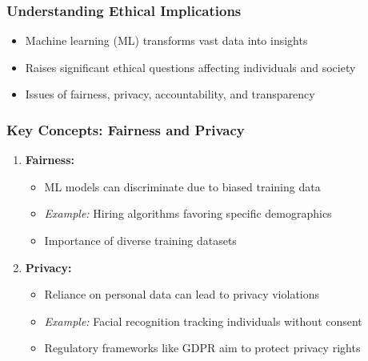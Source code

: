 \documentclass[aspectratio=169]{beamer}
\begin{document}
\begin{frame}[fragile]
    \frametitle{Understanding Ethical Implications}
    \begin{itemize}
        \item Machine learning (ML) transforms vast data into insights 
        \item Raises significant ethical questions affecting individuals and society
        \item Issues of fairness, privacy, accountability, and transparency
    \end{itemize}
\end{frame}

\begin{frame}[fragile]
    \frametitle{Key Concepts: Fairness and Privacy}
    \begin{enumerate}
        \item \textbf{Fairness:}
        \begin{itemize}
            \item ML models can discriminate due to biased training data
            \item \textit{Example:} Hiring algorithms favoring specific demographics
            \item Importance of diverse training datasets
        \end{itemize}
        
        \item \textbf{Privacy:}
        \begin{itemize}
            \item Reliance on personal data can lead to privacy violations
            \item \textit{Example:} Facial recognition tracking individuals without consent
            \item Regulatory frameworks like GDPR aim to protect privacy rights
        \end{itemize}
    \end{enumerate}
\end{frame}
\end{document}

